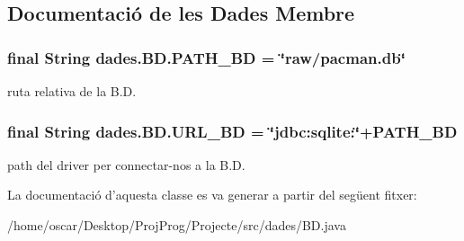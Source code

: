 \subsection{Documentació de les Dades Membre}
\hypertarget{classdades_1_1_b_d_a9d49f7827869e7e71b4527473b673ce8}{
\subsubsection[{P\+A\+T\+H\+\_\+\+B\+D}]{\setlength{\rightskip}{0pt plus 5cm}final String dades.\+B\+D.\+P\+A\+T\+H\+\_\+\+B\+D = \char`\"{}raw/pacman.\+db\char`\"{}\hspace{0.3cm}{\ttfamily [static]}}}\label{classdades_1_1_b_d_a9d49f7827869e7e71b4527473b673ce8}


ruta relativa de la B.\+D. 

\hypertarget{classdades_1_1_b_d_abc83c541acdcd0be2ae8a33daa753077}{
\subsubsection[{U\+R\+L\+\_\+\+B\+D}]{\setlength{\rightskip}{0pt plus 5cm}final String dades.\+B\+D.\+U\+R\+L\+\_\+\+B\+D = \char`\"{}jdbc\+:sqlite\+:\char`\"{}+P\+A\+T\+H\+\_\+\+B\+D\hspace{0.3cm}{\ttfamily [static]}}}\label{classdades_1_1_b_d_abc83c541acdcd0be2ae8a33daa753077}


path del driver per connectar-\/nos a la B.\+D. 



La documentació d'aquesta classe es va generar a partir del següent fitxer\+:\begin{DoxyCompactItemize}
\item 
/home/oscar/\+Desktop/\+Proj\+Prog/\+Projecte/src/dades/B\+D.\+java\end{DoxyCompactItemize}
